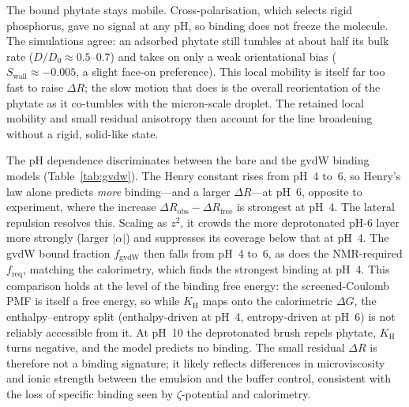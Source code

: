 \documentclass[11pt]{article}
\begin{document}
The bound phytate stays mobile.  Cross-polarisation, which selects rigid
phosphorus, gave no signal at any pH, so binding does not freeze the molecule.
The simulations agree: an adsorbed phytate still tumbles at about half its bulk
rate ($D/D_0\approx0.5$--$0.7$) and takes on only a weak orientational bias
($S_\text{wall}\approx-0.005$, a slight face-on preference).  This local mobility
is itself far too fast to raise $\Delta R$; the slow motion that does is the
overall reorientation of the phytate as it co-tumbles with the micron-scale
droplet.  The retained local mobility and small residual anisotropy then account
for the line broadening without a rigid, solid-like state.

The pH dependence discriminates between the bare and the gvdW binding models
(Table~\ref{tab:gvdw}).  The Henry constant rises from pH~4 to~6, so Henry's law
alone predicts \emph{more} binding---and a larger $\Delta R$---at pH~6, opposite
to experiment, where the increase $\Delta R_\text{obs}-\Delta R_\text{free}$ is
strongest at pH~4.  The lateral repulsion resolves this.  Scaling as $z^2$, it
crowds the more deprotonated pH-6 layer more strongly (larger $|\alpha|$) and
suppresses its coverage below that at pH~4.  The gvdW bound fraction
$f_\text{gvdW}$ then falls from pH~4 to~6, as does the NMR-required $f_\text{req}$,
matching the calorimetry, which finds the strongest binding at pH~4.  This
comparison holds at the level of the binding free energy: the screened-Coulomb
PMF is itself a free energy, so while $K_\text{H}$ maps onto the calorimetric
$\Delta G$, the enthalpy--entropy split (enthalpy-driven at pH~4, entropy-driven
at pH~6) is not reliably accessible from it.
At pH~10 the deprotonated brush repels phytate, $K_\text{H}$ turns negative, and
the model predicts no binding.  The small residual $\Delta R$ is therefore not a
binding signature; it likely reflects differences in microviscosity and ionic
strength between the emulsion and the buffer control, consistent with the loss
of specific binding seen by $\zeta$-potential and calorimetry.
\end{document}

